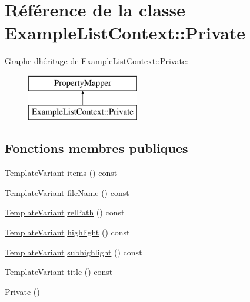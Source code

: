 \hypertarget{class_example_list_context_1_1_private}{}\section{Référence de la classe Example\+List\+Context\+:\+:Private}
\label{class_example_list_context_1_1_private}
Graphe d\textquotesingle{}héritage de Example\+List\+Context\+:\+:Private\+:\begin{figure}[H]
\begin{center}
\leavevmode
\includegraphics[height=2.000000cm]{class_example_list_context_1_1_private}
\end{center}
\end{figure}
\subsection*{Fonctions membres publiques}
\begin{DoxyCompactItemize}
\item 
\hyperlink{class_template_variant}{Template\+Variant} \hyperlink{class_example_list_context_1_1_private_a49bfac80fc9ae8962e0113deb17e21e4}{items} () const 
\item 
\hyperlink{class_template_variant}{Template\+Variant} \hyperlink{class_example_list_context_1_1_private_ab82da399ee84e3bffda6bb85174bd14a}{file\+Name} () const 
\item 
\hyperlink{class_template_variant}{Template\+Variant} \hyperlink{class_example_list_context_1_1_private_a9704a1f8fac09f02368ccf46a680df48}{rel\+Path} () const 
\item 
\hyperlink{class_template_variant}{Template\+Variant} \hyperlink{class_example_list_context_1_1_private_abef6fdce522a3d3d1292d184d292db63}{highlight} () const 
\item 
\hyperlink{class_template_variant}{Template\+Variant} \hyperlink{class_example_list_context_1_1_private_ac23f40d9b3f30b003af96c37ea9a7711}{subhighlight} () const 
\item 
\hyperlink{class_template_variant}{Template\+Variant} \hyperlink{class_example_list_context_1_1_private_a7f9bed1c9306bc68e182fffdbf5e289a}{title} () const 
\item 
\hyperlink{class_example_list_context_1_1_private_a2c3b722b62420f2e6946d07e0bea7b0b}{Private} ()
\end{DoxyCompactItemize}


